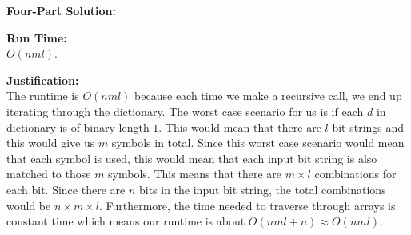 \documentclass[11pt]{article}
\newenvironment{FourPartSolution}{\par{\bf Four-Part Solution:}}{\smallskip}
\newenvironment{runTime}{\par{\bf Run Time:}}{\smallskip}
\newenvironment{justification}{\par{\bf Justification:}}{\smallskip}
\begin{document}
\begin{FourPartSolution}
\begin{runTime}
\\
$O(nml)$.
\end{runTime}
\\
\begin{justification}
\\
The runtime is $O(nml)$ because each time we make a recursive call, we end up iterating through the dictionary. The worst case scenario for us is if each $d$ in dictionary is of binary length $1$. This would mean that there are $l$ bit strings and this would give us $m$ symbols in total. Since this worst case scenario would mean that each symbol is used, this would mean that each input bit string is also matched to those $m$ symbols. This means that there are $m \times l$ combinations for each bit. Since there are $n$ bits in the input bit string, the total combinations would be $n \times m \times l$. Furthermore, the time needed to traverse through arrays is constant time which means our runtime is about $O(nml + n) \approx O(nml)$.
\end{justification}
\end{FourPartSolution}



\newpage
\end{document}
